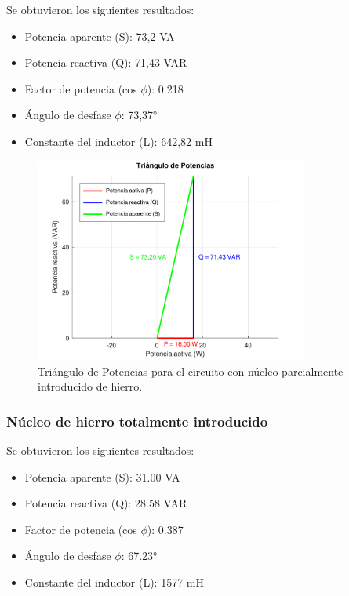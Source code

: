 \documentclass{article}
\begin{document}
                        Se obtuvieron los siguientes resultados:
                        \begin{itemize}
                            \item Potencia aparente (S): 73,2 VA
                            \item Potencia reactiva (Q): 71,43 VAR
                            \item Factor de potencia (cos $\phi$): 0.218
                            \item Ángulo de desfase $\phi$: 73,37°
                            \item Constante del inductor (L): 642,82 mH
                        \end{itemize}

                        \begin{figure}[H]
                            \centering
                            \includegraphics[width=0.8\textwidth]{graficoParcialHierro.png}
                            \caption{Triángulo de Potencias para el circuito con núcleo parcialmente introducido de hierro.}
                            \label{fig:graficoParcialHierro}
                        \end{figure}


                    \subsubsection{Núcleo de hierro totalmente introducido}

                        Se obtuvieron los siguientes resultados:
                        \begin{itemize}
                            \item Potencia aparente (S): 31.00 VA
                            \item Potencia reactiva (Q): 28.58 VAR
                            \item Factor de potencia (cos $\phi$): 0.387
                            \item Ángulo de desfase $\phi$: 67.23°
                            \item Constante del inductor (L): 1577 mH
                        \end{itemize}
\end{document}

